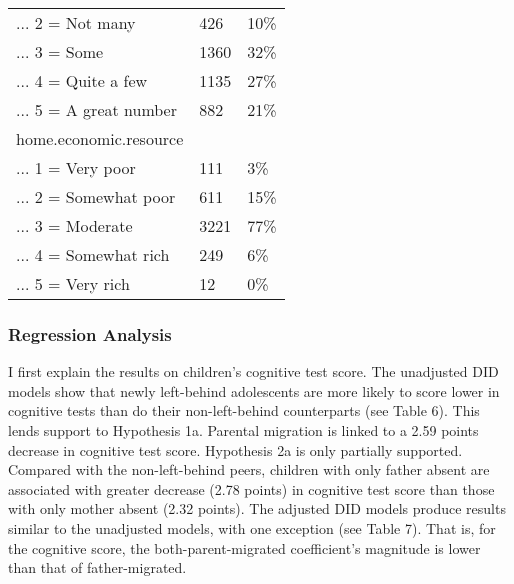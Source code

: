 \documentclass[
  man]{apa7}
\begin{document}
\begin{table}
\begin{tabular}[t]{lll}
... 2 = Not many & 426 & 10\%\\
\addlinespace
... 3 = Some & 1360 & 32\%\\
... 4 = Quite a few & 1135 & 27\%\\
... 5 = A great number & 882 & 21\%\\
home.economic.resource &  & \\
... 1 = Very poor & 111 & 3\%\\
\addlinespace
... 2 = Somewhat poor & 611 & 15\%\\
... 3 = Moderate & 3221 & 77\%\\
... 4 = Somewhat rich & 249 & 6\%\\
... 5 = Very rich & 12 & 0\%\\
\bottomrule
\end{tabular}
\end{table}

\hypertarget{regression-analysis}{%
\subsubsection{Regression Analysis}\label{regression-analysis}}

I first explain the results on children's cognitive test score. The unadjusted DID models show that newly left-behind adolescents are more likely to score lower in cognitive tests than do their non-left-behind counterparts (see Table 6). This lends support to Hypothesis 1a. Parental migration is linked to a 2.59 points decrease in cognitive test score. Hypothesis 2a is only partially supported. Compared with the non-left-behind peers, children with only father absent are associated with greater decrease (2.78 points) in cognitive test score than those with only mother absent (2.32 points). The adjusted DID models produce results similar to the unadjusted models, with one exception (see Table 7). That is, for the cognitive score, the both-parent-migrated coefficient's magnitude is lower than that of father-migrated.
\end{document}
